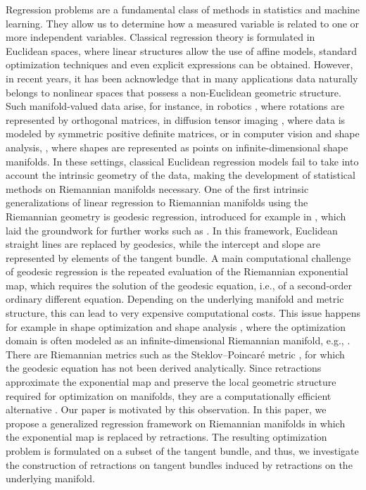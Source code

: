 \documentclass[11pt,a4paper]{article}
\theoremstyle{plain}
\theoremstyle{definition}
\begin{document}
Regression problems are a fundamental class of methods in statistics and machine learning. They allow us to determine how a measured variable is related to one or more independent variables. Classical regression theory is formulated in Euclidean spaces, where linear structures allow the use of affine models, standard optimization techniques and even explicit expressions can be obtained. However, in recent years, it has been acknowledge that in many applications data naturally belongs to nonlinear spaces that possess a non-Euclidean geometric structure. Such manifold-valued data arise, for instance, in robotics \cite{wang2019}, where rotations are represented by orthogonal matrices, in diffusion tensor imaging \cite{pennec2006, dryden2009}, where data is modeled by symmetric positive definite matrices, or in computer vision \cite{turaga2016, cherian2016} and shape analysis, \cite{ring2012, schulz2016}, where shapes are represented as points on infinite-dimensional shape manifolds. In these settings, classical Euclidean regression models fail to take into account the intrinsic geometry of the data, making the development of statistical methods on Riemannian manifolds necessary. One of the first intrinsic generalizations of linear regression to Riemannian manifolds using the Riemannian geometry is geodesic regression, introduced for example in \cite{fletcher2013, niethammer2011}, which laid the groundwork for further works such as \cite{shin2022, hong2012, hinkle2012, fishbaugh2014}. In this framework, Euclidean straight lines are replaced by geodesics, while the intercept and slope are represented by elements of the tangent bundle. A main computational challenge of geodesic regression is the repeated evaluation of the Riemannian exponential map, which requires the solution of the geodesic equation, i.e.,  of a second-order ordinary different equation. Depending on the underlying manifold and metric structure, this can lead to very expensive computational costs. This issue happens for example in shape optimization and shape analysis \cite{schulz2016}, where the optimization domain is often modeled as an infinite-dimensional Riemannian manifold, e.g., \cite{michor2006, bauer2014a}.
There are Riemannian metrics such as the Steklov–Poincaré metric \cite{schulz2016}, for which the geodesic equation has not been derived analytically. Since retractions approximate the exponential map and preserve the local geometric structure required for optimization on manifolds, they are a computationally efficient alternative \cite{absil2008}. 
Our paper is motivated by this observation. In this paper, we propose a generalized regression framework on Riemannian manifolds in which the exponential map is replaced by retractions. 
The resulting optimization problem is formulated on a subset of the tangent bundle, and thus, we investigate the construction of retractions on tangent bundles induced by retractions on the underlying manifold. 
\end{document}
